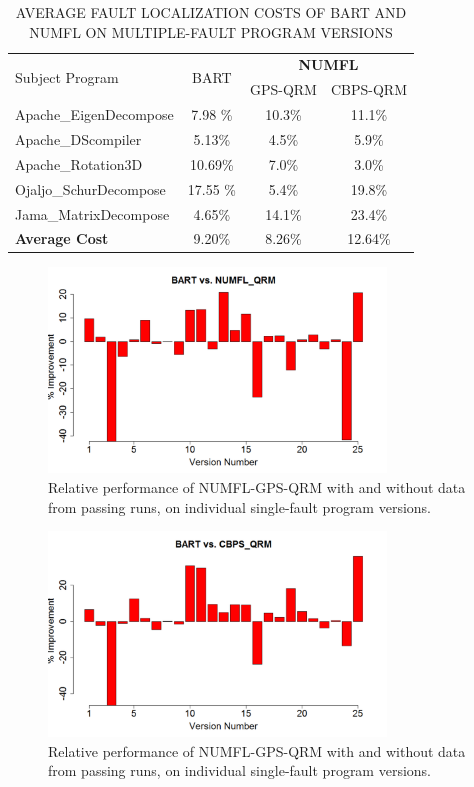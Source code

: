 \begin{table}[htbp!]
\caption{AVERAGE FAULT LOCALIZATION COSTS OF BART AND NUMFL ON MULTIPLE-FAULT PROGRAM VERSIONS}
\label{tableBARTvsNUMFL_M}
\centering
      \begin{tabular}{|l|c|c|c|}
      \hline
\multirow{2}{*}{Subject Program}	& \multirow{2}{*}{BART}&	\multicolumn{2}{|c|}{{\bf NUMFL}}	\\	\cline{3-4}
& & GPS-QRM	&CBPS-QRM \\ \hline
Apache\_EigenDecompose	&7.98	\%&10.3\%	&	11.1\%	\\	\hline
Apache\_DScompiler	&	5.13\%&4.5\%	&	5.9\%	\\	\hline
Apache\_Rotation3D	&	10.69\%&7.0\%	&	3.0\%	\\	\hline
Ojaljo\_SchurDecompose	&17.55	\%&5.4\%	&	19.8\%	\\	\hline
Jama\_MatrixDecompose	&	4.65\%&14.1\%	&	23.4\%	\\	\hline
{\bf Average Cost} &9.20\% &8.26\% &12.64\%\\ \hline
\end{tabular}
\end{table}

\begin{figure}[!thpb]
\centering
\includegraphics[width=0.8\textwidth]{chapter4_BARTvsGPS_QRM_M.pdf}
\caption{Relative performance of NUMFL-GPS-QRM with and without data from passing runs, on individual single-fault program versions.}
\label{BARTvsGPS_M}
\end{figure}

\begin{figure}[!thpb]
\centering
\includegraphics[width=0.8\textwidth]{chapter4_BARTvsCBPS_M.pdf}
\caption{Relative performance of NUMFL-GPS-QRM with and without data from passing runs, on individual single-fault program versions.}
\label{BARTvsCBPS_M}
\end{figure}

